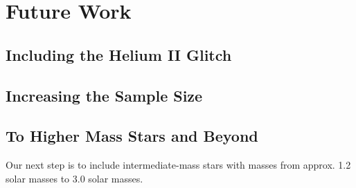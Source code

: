 \chapter{Future Work}

\section{Including the Helium II Glitch}

\section{Increasing the Sample Size}

\section{To Higher Mass Stars and Beyond}

Our next step is to include intermediate-mass stars with masses from approx. 1.2 solar masses to 3.0 solar masses.
